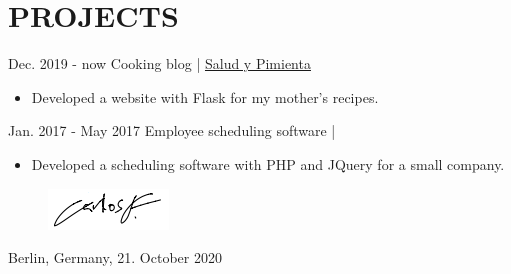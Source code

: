 \documentclass[]{commands}
\begin{document}
\section{PROJECTS}
\begin{entrylist}
 
   \entry
    {Dec. 2019 - now}
    {Cooking blog | }
    { \href{https://www.saludypimienta.com/}{\small Salud y Pimienta \faMousePointer}}
    {}
    {\jobspace
    \begin{itemize}[leftmargin=*, itemsep = 0.1em]
        \item Developed a website with Flask for my mother's recipes.\\
    \end{itemize}}
    
   \entry
    {Jan. 2017 - May 2017}
    {Employee scheduling software | }
    {}
    {}
    {\jobspace
    \begin{itemize}[leftmargin=*, itemsep = 0.1em]
        \item Developed a scheduling software with PHP and JQuery for a small company.\\
    \end{itemize}}
    \vspace{3mm}
\end{entrylist}

\begin{figure}[H]
\hspace{11cm}
\includegraphics{img/signature.png}
\end{figure}
\vspace{-0.8cm}
\hspace{8.5cm} Berlin, Germany, 21. October 2020
\end{document}
